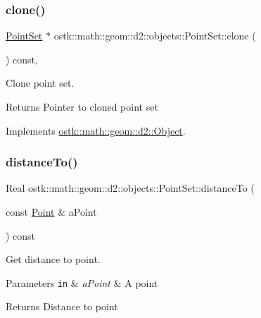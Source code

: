 \subsubsection{\texorpdfstring{clone()}{clone()}}
{\footnotesize\ttfamily \hyperlink{classostk_1_1math_1_1geom_1_1d2_1_1objects_1_1_point_set}{Point\+Set} $\ast$ ostk\+::math\+::geom\+::d2\+::objects\+::\+Point\+Set\+::clone (\begin{DoxyParamCaption}{ }\end{DoxyParamCaption}) const\hspace{0.3cm}{\ttfamily [override]}, {\ttfamily [virtual]}}



Clone point set. 

\begin{DoxyReturn}{Returns}
Pointer to cloned point set 
\end{DoxyReturn}


Implements \hyperlink{classostk_1_1math_1_1geom_1_1d2_1_1_object_a98dedc6792aef35308966ca768eb3e14}{ostk\+::math\+::geom\+::d2\+::\+Object}.

\mbox{\label{classostk_1_1math_1_1geom_1_1d2_1_1objects_1_1_point_set_a3d5dd5bed603fd73b8f0e8eeaeb48693}} 
\subsubsection{\texorpdfstring{distance\+To()}{distanceTo()}}
{\footnotesize\ttfamily Real ostk\+::math\+::geom\+::d2\+::objects\+::\+Point\+Set\+::distance\+To (\begin{DoxyParamCaption}\item[{const \hyperlink{classostk_1_1math_1_1geom_1_1d2_1_1objects_1_1_point}{Point} \&}]{a\+Point }\end{DoxyParamCaption}) const}



Get distance to point. 


\begin{DoxyParams}[1]{Parameters}
\mbox{\tt in}  & {\em a\+Point} & A point \\
\hline
\end{DoxyParams}
\begin{DoxyReturn}{Returns}
Distance to point 
\end{DoxyReturn}
\mbox{\label{classostk_1_1math_1_1geom_1_1d2_1_1objects_1_1_point_set_a09f5e125c7b4545a75e4eea6193bf615}} 
